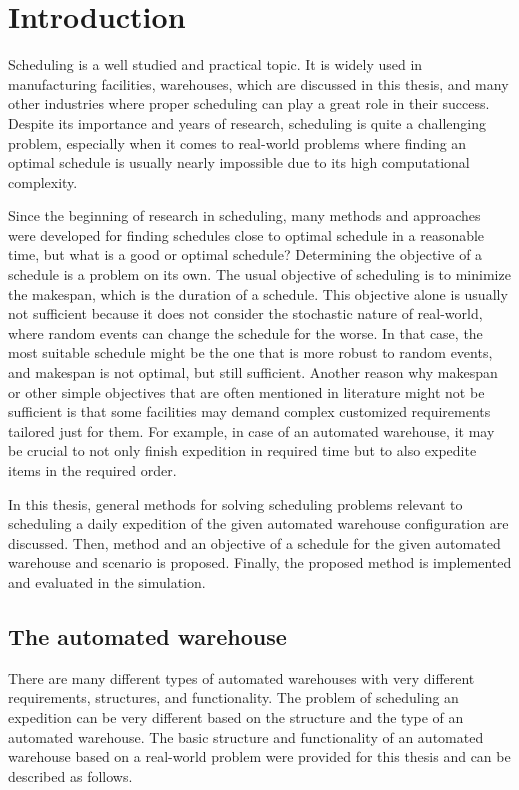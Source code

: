 \documentclass{ctuthesis}
\begin{document}
\maketitle

\chapter{Introduction}

Scheduling is a well studied and practical topic. It is widely used in manufacturing facilities, warehouses, which are discussed in this thesis, and many other industries where proper scheduling can play a great role in their success. Despite its importance and years of research, scheduling is quite a challenging problem, especially when it comes to real-world problems where finding an optimal schedule is usually nearly impossible due to its high computational complexity. 

Since the beginning of research in scheduling, many methods and approaches were developed for finding schedules close to optimal schedule in a reasonable time, but what is a good or optimal schedule? Determining the objective of a schedule is a problem on its own. The usual objective of scheduling is to minimize the makespan, which is the duration of a schedule. This objective alone is usually not sufficient because it does not consider the stochastic nature of real-world, where random events can change the schedule for the worse. In that case, the most suitable schedule might be the one that is more robust to random events, and makespan is not optimal, but still sufficient. Another reason why makespan or other simple objectives that are often mentioned in literature might not be sufficient is that some facilities may demand complex customized requirements tailored just for them. For example, in case of an automated warehouse, it may be crucial to not only finish expedition in required time but to also expedite items in the required order. 

In this thesis, general methods for solving scheduling problems relevant to scheduling a daily expedition of the given automated warehouse configuration are discussed. Then, method and an objective of a schedule for the given automated warehouse and scenario is proposed. Finally, the proposed method is implemented and evaluated in the simulation.

\section{The automated warehouse}
\label{sec:wh}
There are many different types of automated warehouses with very different requirements, structures, and functionality. The problem of scheduling an expedition can be very different based on the structure and the type of an automated warehouse. The basic structure and functionality of an automated warehouse based on a real-world problem were provided for this thesis and can be described as follows.
\end{document}

